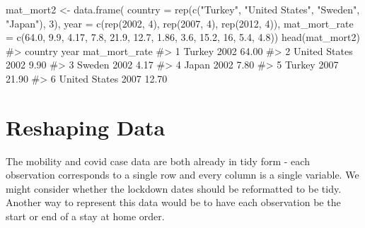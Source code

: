 \documentclass[
  letterpaper,
]{krantz}
\makeatletter
\newenvironment{Shaded}{\begin{snugshade}}{\end{snugshade}}
\newcommand{\AttributeTok}[1]{\textcolor[rgb]{0.40,0.45,0.13}{#1}}
\newcommand{\CommentTok}[1]{\textcolor[rgb]{0.37,0.37,0.37}{#1}}
\newcommand{\DecValTok}[1]{\textcolor[rgb]{0.68,0.00,0.00}{#1}}
\newcommand{\FloatTok}[1]{\textcolor[rgb]{0.68,0.00,0.00}{#1}}
\newcommand{\FunctionTok}[1]{\textcolor[rgb]{0.28,0.35,0.67}{#1}}
\newcommand{\NormalTok}[1]{\textcolor[rgb]{0.00,0.23,0.31}{#1}}
\newcommand{\OtherTok}[1]{\textcolor[rgb]{0.00,0.23,0.31}{#1}}
\newcommand{\StringTok}[1]{\textcolor[rgb]{0.13,0.47,0.30}{#1}}
\newenvironment{kframe}{%
\medskip{}
\setlength{\fboxsep}{.8em}
 \def\at@end@of@kframe{}%
 \ifinner\ifhmode%
  \def\at@end@of@kframe{\end{minipage}}%
  \begin{minipage}{\columnwidth}%
 \fi\fi%
 \def\FrameCommand##1{\hskip\@totalleftmargin \hskip-\fboxsep
 \colorbox{shadecolor}{##1}\hskip-\fboxsep
     \hskip-\linewidth \hskip-\@totalleftmargin \hskip\columnwidth}%
 \MakeFramed {\advance\hsize-\width
   \@totalleftmargin\z@ \linewidth\hsize
   \@setminipage}}%
 {\par\unskip\endMakeFramed%
 \at@end@of@kframe}
\renewenvironment{Shaded}{\begin{kframe}}{\end{kframe}}
\makeatother
\begin{document}
\begin{Shaded}
\begin{Highlighting}[]
\NormalTok{mat\_mort2 }\OtherTok{\textless{}{-}} \FunctionTok{data.frame}\NormalTok{(}
    \AttributeTok{country =} \FunctionTok{rep}\NormalTok{(}\FunctionTok{c}\NormalTok{(}\StringTok{"Turkey"}\NormalTok{, }\StringTok{"United States"}\NormalTok{, }\StringTok{"Sweden"}\NormalTok{, }\StringTok{"Japan"}\NormalTok{), }\DecValTok{3}\NormalTok{),}
    \AttributeTok{year =} \FunctionTok{c}\NormalTok{(}\FunctionTok{rep}\NormalTok{(}\DecValTok{2002}\NormalTok{, }\DecValTok{4}\NormalTok{), }\FunctionTok{rep}\NormalTok{(}\DecValTok{2007}\NormalTok{, }\DecValTok{4}\NormalTok{), }\FunctionTok{rep}\NormalTok{(}\DecValTok{2012}\NormalTok{, }\DecValTok{4}\NormalTok{)),}
    \AttributeTok{mat\_mort\_rate =} \FunctionTok{c}\NormalTok{(}\FloatTok{64.0}\NormalTok{, }\FloatTok{9.9}\NormalTok{, }\FloatTok{4.17}\NormalTok{, }\FloatTok{7.8}\NormalTok{, }\FloatTok{21.9}\NormalTok{, }\FloatTok{12.7}\NormalTok{, }\FloatTok{1.86}\NormalTok{, }\FloatTok{3.6}\NormalTok{, }
                      \FloatTok{15.2}\NormalTok{, }\DecValTok{16}\NormalTok{, }\FloatTok{5.4}\NormalTok{, }\FloatTok{4.8}\NormalTok{))}
\FunctionTok{head}\NormalTok{(mat\_mort2)}
\CommentTok{\#\textgreater{}         country year mat\_mort\_rate}
\CommentTok{\#\textgreater{} 1        Turkey 2002         64.00}
\CommentTok{\#\textgreater{} 2 United States 2002          9.90}
\CommentTok{\#\textgreater{} 3        Sweden 2002          4.17}
\CommentTok{\#\textgreater{} 4         Japan 2002          7.80}
\CommentTok{\#\textgreater{} 5        Turkey 2007         21.90}
\CommentTok{\#\textgreater{} 6 United States 2007         12.70}
\end{Highlighting}
\end{Shaded}

\section{Reshaping Data}\label{reshaping-data}

The mobility and covid case data are both already in tidy form - each
observation corresponds to a single row and every column is a single
variable. We might consider whether the lockdown dates should be
reformatted to be tidy. Another way to represent this data would be to
have each observation be the start or end of a stay at home order.
\end{document}
